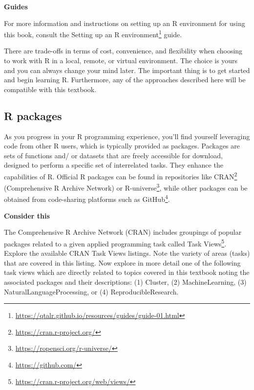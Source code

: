 \documentclass[
  letterpaper,
]{latex/krantz}
\theoremstyle{definition}
\theoremstyle{remark}
\DeclareRobustCommand{\href}[2]{#2\footnote{\url{#1}}}
\begin{document}
\begin{tcolorbox}[enhanced jigsaw, colframe=quarto-callout-color-frame, breakable, bottomrule=.15mm, arc=.35mm, left=2mm, opacityback=0, rightrule=.15mm, colback=white, toprule=.15mm, leftrule=.75mm]

\textbf{ Guides}

For more information and instructions on setting up an R environment for
using this book, consult the
\href{https://qtalr.github.io/resources/guides/guide-01.html}{Setting up
an R environment} guide.

\end{tcolorbox}

There are trade-offs in terms of cost, convenience, and flexibility when
choosing to work with R in a local, remote, or virtual environment. The
choice is yours and you can always change your mind later. The important
thing is to get started and begin learning R. Furthermore, any of the
approaches described here will be compatible with this textbook.

\subsection*{R packages}\label{sec-p-r-packages}

As you progress in your R programming experience, you'll find yourself
leveraging code from other R users, which is typically provided as
packages. Packages are sets of functions and/ or datasets that are
freely accessible for download, designed to perform a specific set of
interrelated tasks. They enhance the capabilities of R. Official R
packages can be found in repositories like
\href{https://cran.r-project.org/}{CRAN} (Comprehensive R Archive
Network) or \href{https://ropensci.org/r-universe/}{R-universe}, while
other packages can be obtained from code-sharing platforms such as
\href{https://github.com/}{GitHub}.

\begin{tcolorbox}[enhanced jigsaw, colframe=quarto-callout-color-frame, breakable, bottomrule=.15mm, arc=.35mm, left=2mm, opacityback=0, rightrule=.15mm, colback=white, toprule=.15mm, leftrule=.75mm]

\textbf{ Consider this}

The Comprehensive R Archive Network (CRAN) includes groupings of popular
packages related to a given applied programming task called
\href{https://cran.r-project.org/web/views/}{Task Views}. Explore the
available CRAN Task Views listings. Note the variety of areas (tasks)
that are covered in this listing. Now explore in more detail one of the
following task views which are directly related to topics covered in
this textbook noting the associated packages and their descriptions: (1)
Cluster, (2) MachineLearning, (3) NaturalLanguageProcessing, or (4)
ReproducibleResearch.

\end{tcolorbox}
\end{document}
